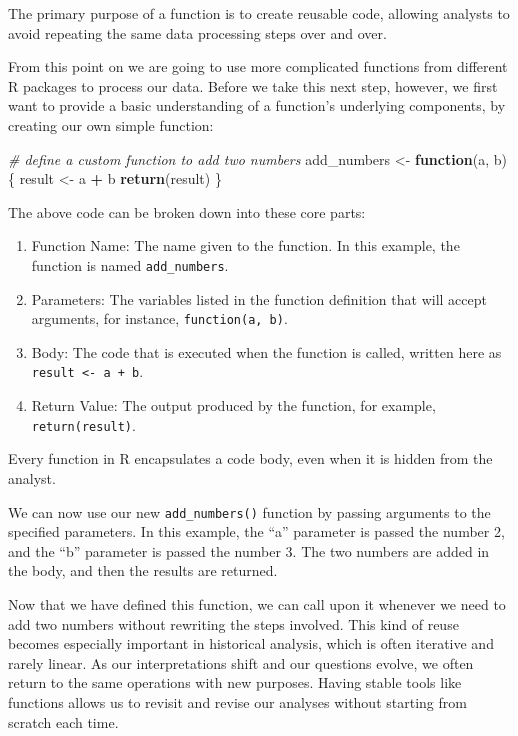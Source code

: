 \documentclass[
]{article}
\newenvironment{Shaded}{\begin{snugshade}}{\end{snugshade}}
\newcommand{\CommentTok}[1]{\textcolor[rgb]{0.56,0.35,0.01}{\textit{#1}}}
\newcommand{\ControlFlowTok}[1]{\textcolor[rgb]{0.13,0.29,0.53}{\textbf{#1}}}
\newcommand{\FunctionTok}[1]{\textcolor[rgb]{0.13,0.29,0.53}{\textbf{#1}}}
\newcommand{\NormalTok}[1]{#1}
\newcommand{\OtherTok}[1]{\textcolor[rgb]{0.56,0.35,0.01}{#1}}
\newcommand{\SpecialCharTok}[1]{\textcolor[rgb]{0.81,0.36,0.00}{\textbf{#1}}}
\providecommand{\tightlist}{%
  \setlength{\itemsep}{0pt}\setlength{\parskip}{0pt}}
\begin{document}
The primary purpose of a function is to create reusable code, allowing
analysts to avoid repeating the same data processing steps over and
over.

From this point on we are going to use more complicated functions from
different R packages to process our data. Before we take this next step,
however, we first want to provide a basic understanding of a function's
underlying components, by creating our own simple function:

\begin{Shaded}
\begin{Highlighting}[]
\CommentTok{\# define a custom function to add two numbers}
\NormalTok{add\_numbers }\OtherTok{\textless{}{-}} \ControlFlowTok{function}\NormalTok{(a, b) \{ }
\NormalTok{  result }\OtherTok{\textless{}{-}}\NormalTok{ a }\SpecialCharTok{+}\NormalTok{ b }
  \FunctionTok{return}\NormalTok{(result) \}}
\end{Highlighting}
\end{Shaded}

The above code can be broken down into these core parts:

\begin{enumerate}
\def\labelenumi{\arabic{enumi}.}
\tightlist
\item
  Function Name: The name given to the function. In this example, the
  function is named \texttt{add\_numbers}.
\item
  Parameters: The variables listed in the function definition that will
  accept arguments, for instance, \texttt{function(a,\ b)}.
\item
  Body: The code that is executed when the function is called, written
  here as \texttt{result\ \textless{}-\ a\ +\ b}.
\item
  Return Value: The output produced by the function, for example,
  \texttt{return(result)}.
\end{enumerate}

Every function in R encapsulates a code body, even when it is hidden
from the analyst.

We can now use our new \texttt{add\_numbers()} function by passing
arguments to the specified parameters. In this example, the ``a''
parameter is passed the number 2, and the ``b'' parameter is passed the
number 3. The two numbers are added in the body, and then the results
are returned.

Now that we have defined this function, we can call upon it whenever we
need to add two numbers without rewriting the steps involved. This kind
of reuse becomes especially important in historical analysis, which is
often iterative and rarely linear. As our interpretations shift and our
questions evolve, we often return to the same operations with new
purposes. Having stable tools like functions allows us to revisit and
revise our analyses without starting from scratch each time.
\end{document}
